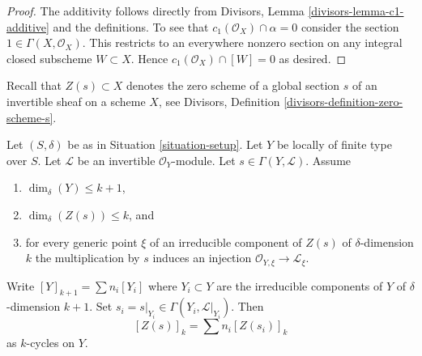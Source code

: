 \begin{proof}
The additivity follows directly from
Divisors, Lemma \ref{divisors-lemma-c1-additive}
and the definitions. To see that $c_1(\mathcal{O}_X) \cap \alpha = 0$
consider the section $1 \in \Gamma(X, \mathcal{O}_X)$. This restricts
to an everywhere nonzero section on any integral closed subscheme
$W \subset X$. Hence $c_1(\mathcal{O}_X) \cap [W] = 0$ as desired.
\end{proof}

\noindent
Recall that $Z(s) \subset X$ denotes the zero scheme of a global section
$s$ of an invertible sheaf on a scheme $X$, see
Divisors, Definition \ref{divisors-definition-zero-scheme-s}.

\begin{lemma}
\label{lemma-prepare-geometric-cap}
Let $(S, \delta)$ be as in Situation \ref{situation-setup}.
Let $Y$ be locally of finite type over $S$.
Let $\mathcal{L}$ be an invertible $\mathcal{O}_Y$-module.
Let $s \in \Gamma(Y, \mathcal{L})$.
Assume
\begin{enumerate}
\item $\dim_\delta(Y) \leq k + 1$,
\item $\dim_\delta(Z(s)) \leq k$, and
\item for every generic point $\xi$ of an irreducible component of
$Z(s)$ of $\delta$-dimension $k$ the multiplication by $s$
induces an injection $\mathcal{O}_{Y, \xi} \to \mathcal{L}_\xi$.
\end{enumerate}
Write $[Y]_{k + 1} = \sum n_i[Y_i]$ where $Y_i \subset Y$ are the
irreducible components of $Y$ of $\delta$-dimension $k + 1$.
Set $s_i = s|_{Y_i} \in \Gamma(Y_i, \mathcal{L}|_{Y_i})$. Then
\begin{equation}
\label{equation-equal-as-cycles}
[Z(s)]_k =  \sum n_i[Z(s_i)]_k
\end{equation}
as $k$-cycles on $Y$.
\end{lemma}

